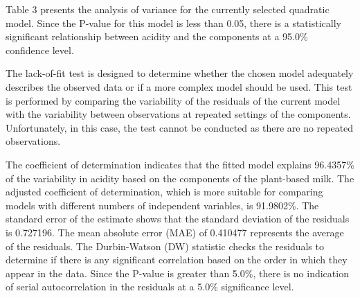 
Table 3 presents the analysis of variance for the currently selected
quadratic model. Since the P-value for this model is less than 0.05,
there is a statistically significant relationship between acidity and
the components at a 95.0\% confidence level.

The lack-of-fit test is designed to determine whether the chosen model
adequately describes the observed data or if a more complex model should
be used. This test is performed by comparing the variability of the
residuals of the current model with the variability between observations
at repeated settings of the components. Unfortunately, in this case, the
test cannot be conducted as there are no repeated observations.

The coefficient of determination indicates that the fitted model
explains 96.4357\% of the variability in acidity based on the components
of the plant-based milk. The adjusted coefficient of determination,
which is more suitable for comparing models with different numbers of
independent variables, is 91.9802\%. The standard error of the estimate
shows that the standard deviation of the residuals is 0.727196. The mean
absolute error (MAE) of 0.410477 represents the average of the
residuals. The Durbin-Watson (DW) statistic checks the residuals to
determine if there is any significant correlation based on the order in
which they appear in the data. Since the P-value is greater than 5.0\%,
there is no indication of serial autocorrelation in the residuals at a
5.0\% significance level.

